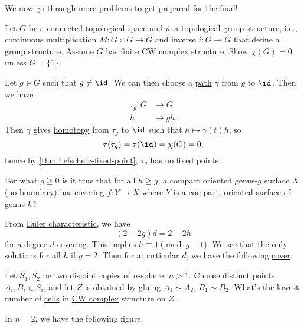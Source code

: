 We now go through more problems to get prepared for the final!
\begin{exercise}[QR Jan. 2021]
	Let \(G\) be a connected topological space and \(\overline{w} \) a topological group structure, i.e., continuous multiplication \(M\colon G\times G \to G\) and inverse \(i\colon G\to G\) that define a group structure. Assume \(G\) has finite \hyperref[def:CW-Complex]{CW complex} structure. Show \(\chi (G) = 0\) unless \(G = \{1\}\).
\end{exercise}
\begin{answer}
	Let \(g\in G\) such that \(g \neq \id_{} \). We can then choose a \hyperref[def:path]{path} \(\gamma \) from \(g\) to \(\id_{} \). Then we have
	\[
		\begin{split}
			\tau _g\colon G & \to G       \\
			h               & \mapsto gh.
		\end{split}
	\]
	Then \(\gamma \) gives \hyperref[def:homotopy]{homotopy} from \(\tau _g\) to \(\id_{} \) such that \(h \mapsto \gamma (t) h\), so
	\[
		\tau (\tau _{g} )= \tau (\id_{} )= \chi (G) = 0,
	\]
	hence by \autoref{thm:Lefschetz-fixed-point}, \(\tau _g\) has no fixed points.
\end{answer}

\begin{exercise}[QR May 2019]
	For what \(g \geq 0\) is it true that for all \(h \geq g\), a compact oriented genus-\(g\) surface \(X\) (no boundary) has covering \(f\colon Y\to X\) where \(Y\) is a compact, oriented surface of genus-\(h\)?
\end{exercise}
\begin{answer}
	From \hyperref[def:Euler-characteristic]{Euler characteristic}, we have
	\[
		(2 - 2g) d = 2 - 2h
	\]
	for a degree \(d\) \hyperref[def:covering-space]{covering}. This implies \(h \equiv 1\pmod {g-1}\). We see that the only solutions for all \(h\) if \(g = 2\). Then for a particular \(d\), we have the following \hyperref[def:covering-space]{cover}.
	\begin{figure}[H]
		\centering
		\label{fig:lec-41-2}
	\end{figure}
\end{answer}

\begin{exercise}[QR Jan. 2019]
	Let \(S_1, S_2\) be two disjoint  copies of \(n\)-sphere, \(n>1\). Choose distinct points \(A_{i} , B_{i} \in S_{i} \), and let \(Z\) is obtained by gluing \(A_1\sim A_2\), \(B_1\sim B_2\). What's the lowest number of \hyperref[def:cell]{cells} in \hyperref[def:CW-Complex]{CW complex} structure on \(Z\).
\end{exercise}
\begin{answer}
	In \(n=2\), we have the following figure.
	\begin{figure}[H]
		\centering
		\label{fig:lec-41-3}
	\end{figure}
\end{answer}

